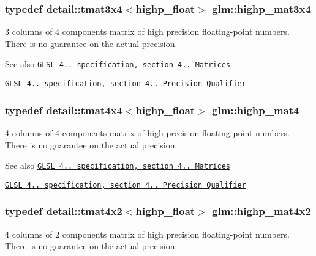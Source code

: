 \subsubsection[{highp\+\_\+mat3x4}]{\setlength{\rightskip}{0pt plus 5cm}typedef detail\+::tmat3x4$<$highp\+\_\+float$>$ {\bf glm\+::highp\+\_\+mat3x4}}\label{group__core__precision_ga55fe92f6217fa20816f52f748fb399c7}
3 columns of 4 components matrix of high precision floating-\/point numbers. There is no guarantee on the actual precision.

\begin{DoxySeeAlso}{See also}
\href{http://www.opengl.org/registry/doc/GLSLangSpec.4.20.8.pdf}{\tt G\+L\+S\+L 4.. specification, section 4.. Matrices} 

\href{http://www.opengl.org/registry/doc/GLSLangSpec.4.20.8.pdf}{\tt G\+L\+S\+L 4.. specification, section 4.. Precision Qualifier} 
\end{DoxySeeAlso}
\hypertarget{group__core__precision_gacab0d5de2ce45d2d2e08e4563a15377f}{}
\subsubsection[{highp\+\_\+mat4}]{\setlength{\rightskip}{0pt plus 5cm}typedef detail\+::tmat4x4$<$highp\+\_\+float$>$ {\bf glm\+::highp\+\_\+mat4}}\label{group__core__precision_gacab0d5de2ce45d2d2e08e4563a15377f}
4 columns of 4 components matrix of high precision floating-\/point numbers. There is no guarantee on the actual precision.

\begin{DoxySeeAlso}{See also}
\href{http://www.opengl.org/registry/doc/GLSLangSpec.4.20.8.pdf}{\tt G\+L\+S\+L 4.. specification, section 4.. Matrices} 

\href{http://www.opengl.org/registry/doc/GLSLangSpec.4.20.8.pdf}{\tt G\+L\+S\+L 4.. specification, section 4.. Precision Qualifier} 
\end{DoxySeeAlso}
\hypertarget{group__core__precision_gaea696a76cb6e8c9b85ee9f0fd2e38a05}{}
\subsubsection[{highp\+\_\+mat4x2}]{\setlength{\rightskip}{0pt plus 5cm}typedef detail\+::tmat4x2$<$highp\+\_\+float$>$ {\bf glm\+::highp\+\_\+mat4x2}}\label{group__core__precision_gaea696a76cb6e8c9b85ee9f0fd2e38a05}
4 columns of 2 components matrix of high precision floating-\/point numbers. There is no guarantee on the actual precision.

